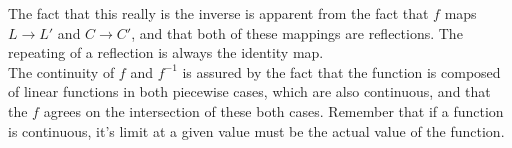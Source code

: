 \documentclass{article}
\newcommand{\inv}[1]{#1^{-1}}
\newcommand{\inv}[1]{#1^{-1}}
\begin{document}
The fact that this really is the inverse is apparent from the fact that $f$ maps $L\rightarrow L'$ and $C\rightarrow C'$, and that both of these mappings are reflections. The repeating of a reflection is always the identity map.\\

The continuity of $f$ and $\inv{f}$ is assured by the fact that the function is composed of linear functions in both piecewise cases, which are also continuous, and that the $f$ agrees on the intersection of these both cases. Remember that if a function is continuous, it's limit at a given value must be the actual value of the function.
\end{document}
